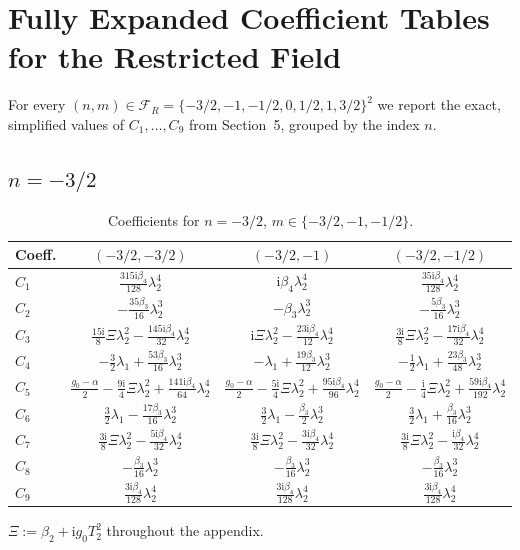 \documentclass[11pt]{article}
\newcommand{\ii}{\mathrm{i}}
\begin{document}
\appendix
\section{Fully Expanded Coefficient Tables for the Restricted Field}
\label{app:tables}

For every $(n,m)\in\mathcal{F}_R=\{-3/2,-1,-1/2,0,1/2,1,3/2\}^2$ we report the exact,
simplified values of $C_1,\dots,C_9$ from Section~5, grouped by the index $n$.

\subsection{$n=-3/2$}

\begin{table}[htbp]
\centering\small
\caption{Coefficients for $n=-3/2$, $m\in\{-3/2,-1,-1/2\}$.}
\begin{tabular}{lccc}
\toprule
Coeff. & $(-3/2,-3/2)$ & $(-3/2,-1)$ & $(-3/2,-1/2)$ \\
\midrule
$C_1$ & $\tfrac{315\ii\beta_4}{128}\lambda_2^4$ & $\ii\beta_4\lambda_2^4$ & $\tfrac{35\ii\beta_4}{128}\lambda_2^4$ \\
$C_2$ & $-\tfrac{35\beta_3}{16}\lambda_2^3$ & $-\beta_3\lambda_2^3$ & $-\tfrac{5\beta_3}{16}\lambda_2^3$ \\
$C_3$ & $\tfrac{15\ii}{8}\Xi\lambda_2^2-\tfrac{145\ii\beta_4}{32}\lambda_2^4$ & $\ii\Xi\lambda_2^2-\tfrac{23\ii\beta_4}{12}\lambda_2^4$ & $\tfrac{3\ii}{8}\Xi\lambda_2^2-\tfrac{17\ii\beta_4}{32}\lambda_2^4$ \\
$C_4$ & $-\tfrac32\lambda_1+\tfrac{53\beta_3}{16}\lambda_2^3$ & $-\lambda_1+\tfrac{19\beta_3}{12}\lambda_2^3$ & $-\tfrac12\lambda_1+\tfrac{23\beta_3}{48}\lambda_2^3$ \\
$C_5$ & $\tfrac{g_0-\alpha}{2}-\tfrac{9\ii}{4}\Xi\lambda_2^2+\tfrac{141\ii\beta_4}{64}\lambda_2^4$ & $\tfrac{g_0-\alpha}{2}-\tfrac{5\ii}{4}\Xi\lambda_2^2+\tfrac{95\ii\beta_4}{96}\lambda_2^4$ & $\tfrac{g_0-\alpha}{2}-\tfrac{\ii}{4}\Xi\lambda_2^2+\tfrac{59\ii\beta_4}{192}\lambda_2^4$ \\
$C_6$ & $\tfrac32\lambda_1-\tfrac{17\beta_3}{16}\lambda_2^3$ & $\tfrac32\lambda_1-\tfrac{\beta_3}{2}\lambda_2^3$ & $\tfrac32\lambda_1+\tfrac{\beta_3}{16}\lambda_2^3$ \\
$C_7$ & $\tfrac{3\ii}{8}\Xi\lambda_2^2-\tfrac{5\ii\beta_4}{32}\lambda_2^4$ & $\tfrac{3\ii}{8}\Xi\lambda_2^2-\tfrac{3\ii\beta_4}{32}\lambda_2^4$ & $\tfrac{3\ii}{8}\Xi\lambda_2^2-\tfrac{\ii\beta_4}{32}\lambda_2^4$ \\
$C_8$ & $-\tfrac{\beta_3}{16}\lambda_2^3$ & $-\tfrac{\beta_3}{16}\lambda_2^3$ & $-\tfrac{\beta_3}{16}\lambda_2^3$ \\
$C_9$ & $\tfrac{3\ii\beta_4}{128}\lambda_2^4$ & $\tfrac{3\ii\beta_4}{128}\lambda_2^4$ & $\tfrac{3\ii\beta_4}{128}\lambda_2^4$ \\
\bottomrule
\end{tabular}
\vspace{2pt}
\footnotesize{$\Xi:=\beta_2+\ii g_0T_2^2$ throughout the appendix.}
\end{table}
\end{document}
